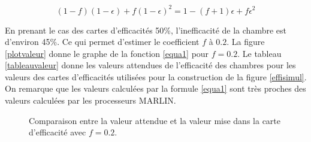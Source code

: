 \begin{equation}
(1-f)(1-\epsilon)+f(1-\epsilon)^2=1-(f+1)\epsilon+f\epsilon^2 \label{equa1}
\end{equation}

En prenant le cas des cartes d'efficacités 50\%, l'inefficacité de la chambre est d'environ 45\%. Ce qui permet d'estimer le coefficient $f$ à $0.2$. La figure \ref{plotvaleur} donne le graphe de la fonction \ref{equa1} pour $f=0.2$. Le tableau \ref{tableauvaleur} donne les valeurs attendues de l'efficacité des chambres pour les valeurs des cartes d'efficacités utilisées pour la construction de la figure \ref{effisimul}. On remarque que les valeurs calculées par la formule \ref{equa1} sont très proches des valeurs calculées par les processeurs MARLIN.
\vspace*{-0.6cm}
	\begin{figure}[ht!]
    \hfill
	\caption{Comparaison entre la valeur attendue et la valeur mise dans la carte d'efficacité avec $f=0.2$. }
	\label{Comparaison}
\end{figure}

